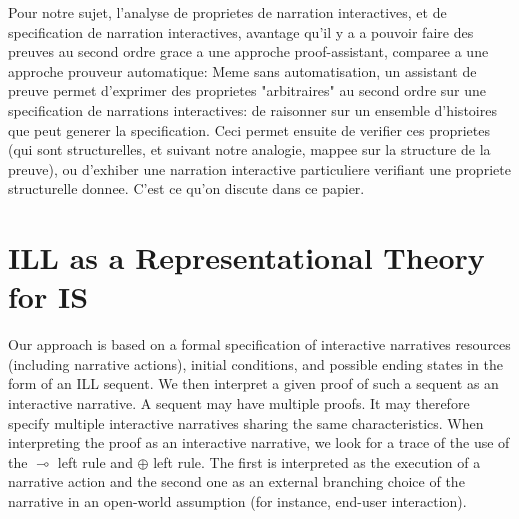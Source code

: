 \documentclass[runningheads,a4paper]{llncs}
\begin{document}
Pour notre sujet, l'analyse de proprietes de narration interactives, et de specification de narration interactives, avantage qu'il y a a pouvoir faire des preuves au second ordre grace a une approche proof-assistant, comparee a une approche prouveur automatique: Meme sans automatisation, un assistant de preuve permet d'exprimer des proprietes "arbitraires" au second ordre sur une specification de narrations interactives: de raisonner sur un ensemble d'histoires que peut generer la specification. Ceci permet ensuite de verifier ces proprietes (qui sont structurelles, et suivant notre analogie, mappee sur la structure de la preuve), ou d'exhiber une narration interactive particuliere verifiant une propriete structurelle donnee. C'est ce qu'on discute dans ce papier.
\section{ILL as a Representational Theory for IS}
%
Our approach is based on a formal specification of interactive narratives resources (including narrative actions), initial conditions, and possible ending states in the form of an ILL sequent. We then interpret a given proof of such a sequent as an interactive narrative. A sequent may have multiple proofs. It may therefore specify multiple interactive narratives sharing the same characteristics. When interpreting the proof as an interactive narrative, we look for a trace of the use of the $\multimap$ left rule and $\oplus$ left rule. The first is interpreted as the execution of a narrative action and the second one as an external branching choice of the narrative in an open-world assumption (for instance, end-user interaction).  
\end{document}
